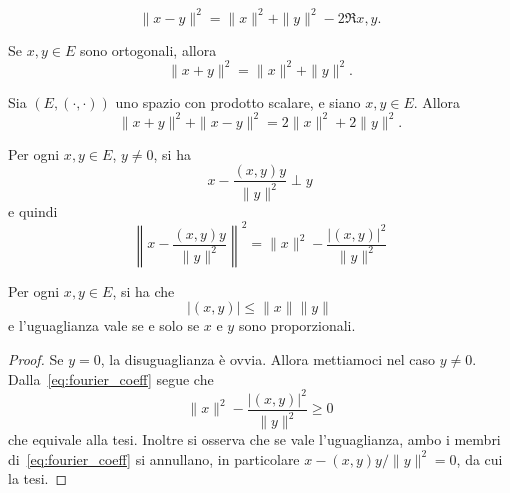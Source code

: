 \begin{lemma}
	\begin{equation}
		\label{eq:carnot}
			\|x-y\|^2 = \|x\|^2 + \|y\|^2 - 2 \Re{x,y}.
		\end{equation}
\end{lemma}

\begin{lemma}
	Se $x,y \in E$ sono ortogonali, allora
	\begin{equation*}
		\|x+y\|^2 = \|x\|^2+\|y\|^2.
	\end{equation*}
\end{lemma}

\begin{lemma}
\label{lemma:par_identity}
	Sia $(E, (\cdot,\cdot))$ uno spazio con prodotto scalare, e siano $x,y \in E$.
	Allora
	\begin{equation*}
		\|x+y\|^2 + \|x-y\|^2 = 2\|x\|^2 + 2\|y\|^2.
	\end{equation*}
\end{lemma}

\begin{lemma}
	Per ogni $x,y \in E$, $y \neq 0$, si ha
	\begin{equation*}
		x - \frac{(x,y)y}{\|y\|^2} \perp y
	\end{equation*}
	e quindi
	\begin{equation}
	\label{eq:fourier_coeff}
		\left\|x - \frac{(x,y)y}{\|y\|^2}\right\|^2 = \|x\|^2 - \frac{|(x,y)|^2}{\|y\|^2}
	\end{equation}
\end{lemma}

\begin{lemma}
	Per ogni $x,y \in E$, si ha che
	\begin{equation*}
		|(x,y)| \leq \|x\| \|y\|
	\end{equation*}
	e l'uguaglianza vale se e solo se $x$ e $y$ sono proporzionali.
\end{lemma}
\begin{proof}
	Se $y=0$, la disuguaglianza è ovvia. Allora mettiamoci nel caso $y \neq 0$. Dalla~\eqref{eq:fourier_coeff} segue che
	\begin{equation*}
		\|x\|^2 - \frac{|(x,y)|^2}{\|y\|^2} \geq 0
	\end{equation*}
	che equivale alla tesi. Inoltre si osserva che se vale l'uguaglianza, ambo i membri di~\eqref{eq:fourier_coeff} si annullano, in particolare $x-(x,y)y/\|y\|^2 = 0$, da cui la tesi.
\end{proof}


